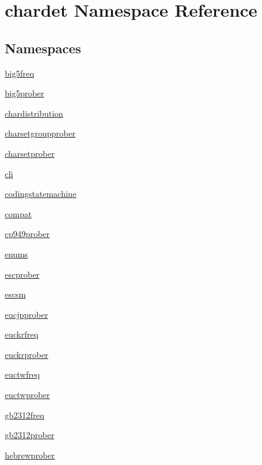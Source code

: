 \hypertarget{namespacechardet}{}\section{chardet Namespace Reference}
\label{namespacechardet}
\subsection*{Namespaces}
\begin{DoxyCompactItemize}
\item 
 \hyperlink{namespacechardet_1_1big5freq}{big5freq}
\item 
 \hyperlink{namespacechardet_1_1big5prober}{big5prober}
\item 
 \hyperlink{namespacechardet_1_1chardistribution}{chardistribution}
\item 
 \hyperlink{namespacechardet_1_1charsetgroupprober}{charsetgroupprober}
\item 
 \hyperlink{namespacechardet_1_1charsetprober}{charsetprober}
\item 
 \hyperlink{namespacechardet_1_1cli}{cli}
\item 
 \hyperlink{namespacechardet_1_1codingstatemachine}{codingstatemachine}
\item 
 \hyperlink{namespacechardet_1_1compat}{compat}
\item 
 \hyperlink{namespacechardet_1_1cp949prober}{cp949prober}
\item 
 \hyperlink{namespacechardet_1_1enums}{enums}
\item 
 \hyperlink{namespacechardet_1_1escprober}{escprober}
\item 
 \hyperlink{namespacechardet_1_1escsm}{escsm}
\item 
 \hyperlink{namespacechardet_1_1eucjpprober}{eucjpprober}
\item 
 \hyperlink{namespacechardet_1_1euckrfreq}{euckrfreq}
\item 
 \hyperlink{namespacechardet_1_1euckrprober}{euckrprober}
\item 
 \hyperlink{namespacechardet_1_1euctwfreq}{euctwfreq}
\item 
 \hyperlink{namespacechardet_1_1euctwprober}{euctwprober}
\item 
 \hyperlink{namespacechardet_1_1gb2312freq}{gb2312freq}
\item 
 \hyperlink{namespacechardet_1_1gb2312prober}{gb2312prober}
\item 
 \hyperlink{namespacechardet_1_1hebrewprober}{hebrewprober}

\end{DoxyCompactItemize}
